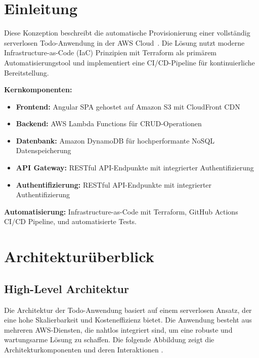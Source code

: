 \newpage

\section{Einleitung}
Diese Konzeption beschreibt die automatische Provisionierung einer vollständig serverlosen Todo-Anwendung
in der AWS Cloud~\cite{jain2021serverless, wen2023rise}. 
Die Lösung nutzt moderne Infrastructure-as-Code (IaC) Prinzipien mit Terraform als 
primärem Automatisierungstool \cite{ozdogan2023systematic, hashicorp2024terraform}  
und implementiert eine CI/CD-Pipeline für kontinuierliche Bereitstellung.

\textbf{Kernkomponenten:}

\begin{itemize}
    \item \textbf{Frontend:} Angular SPA gehostet auf Amazon S3 mit CloudFront CDN~\cite{cloudfront2012performance, tyagi2025optimizing}
    \item \textbf{Backend:} AWS Lambda Functions für CRUD-Operationen~\cite{hussain2024performance, tanneru2024serverless}
    \item \textbf{Datenbank:} Amazon DynamoDB für hochperformante NoSQL Datenspeicherung \cite{haseeb2017review, ahmed2018literature}
    \item \textbf{API Gateway:} RESTful API-Endpunkte mit integrierter Authentifizierung
    \item \textbf{Authentifizierung:} RESTful API-Endpunkte mit integrierter Authentifizierung 
\end{itemize}

\textbf{Automatisierung:} Infrastructure-as-Code mit Terraform, GitHub Actions CI/CD Pipeline, 
und automatisierte Tests.

\section{Architekturüberblick} 

\subsection{High-Level Architektur}

Die Architektur der Todo-Anwendung basiert auf einem serverlosen Ansatz, der eine hohe
Skalierbarkeit und Kosteneffizienz bietet. Die Anwendung besteht aus mehreren AWS-Diensten, 
die nahtlos integriert sind, um eine robuste und wartungsarme Lösung zu schaffen.
Die folgende Abbildung zeigt die Architekturkomponenten und deren Interaktionen
\cite{maharjan2022evaluating}.

